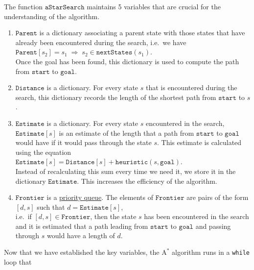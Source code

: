 The function $\mathtt{aStarSearch}$ maintains 5 variables that are crucial for the understanding of the
algorithm.
\begin{enumerate}
\item $\mathtt{Parent}$ is a dictionary associating a parent state with those states that have already been
      encountered during the search, i.e.~we have
      \\[0.2cm]
      \hspace*{1.3cm}
      $\mathtt{Parent}[s_2] = s_1 \;\Rightarrow\; s_2 \in \mathtt{nextStates}(s_1)$.
      \\[0.2cm]
      Once the goal has been found, this dictionary is used to compute the path from $\mathtt{start}$ to
      $\mathtt{goal}$.
\item $\mathtt{Distance}$ is a dictionary.  For every state $s$ that is encountered during the
      search,  this dictionary records the length of the shortest path from $\mathtt{start}$ to $s$.
\item $\mathtt{Estimate}$ is a dictionary.  For every state $s$ encountered in the search, $\mathtt{Estimate}[s]$
      is an estimate of the length that a path from $\mathtt{start}$ to $\mathtt{goal}$ would have if it would
      pass through the state $s$.  This estimate is calculated using the equation
      \\[0.2cm]
      \hspace*{1.3cm}
      $\mathtt{Estimate}[s] = \mathtt{Distance}[s] + \mathtt{heuristic}(s, \mathtt{goal})$.
      \\[0.2cm]
      Instead of recalculating this sum every time we need it, we store it in the dictionary
      $\mathtt{Estimate}$.  This increases the efficiency of the algorithm.
\item $\mathtt{Frontier}$ is a \href{https://en.wikipedia.org/wiki/Priority_queue}{priority queue}.
      The elements of $\mathtt{Frontier}$ are pairs of the form
      \\[0.2cm]
      \hspace*{1.3cm}
      $[d, s]$ \quad such that \quad $d = \mathtt{Estimate}[s]$,
      \\[0.2cm]
      i.e.~if $[d, s] \in \mathtt{Frontier}$, then the state $s$ has been encountered in the search and it is
      estimated that a path leading from $\mathtt{start}$ to $\mathtt{goal}$ and passing through $s$ would have
      a length of $d$.
\end{enumerate}
Now that we have established the key variables, the $\mathrm{A}^*$ algorithm runs in a \texttt{while} loop that
